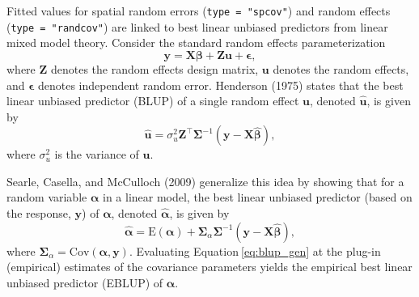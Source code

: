 \documentclass{article}
\begin{document}
Fitted values for spatial random errors (\texttt{type\ =\ "spcov"}) and
random effects (\texttt{type\ =\ "randcov"}) are linked to best linear
unbiased predictors from linear mixed model theory. Consider the
standard random effects parameterization \begin{equation*}
  \mathbf{y} = \mathbf{X} \boldsymbol{\beta} + \mathbf{Z} \mathbf{u} + \boldsymbol{\epsilon},
\end{equation*} where \(\mathbf{Z}\) denotes the random effects design
matrix, \(\mathbf{u}\) denotes the random effects, and
\(\boldsymbol{\epsilon}\) denotes independent random error. Henderson
(1975) states that the best linear unbiased predictor (BLUP) of a single
random effect \(\mathbf{u}\), denoted \(\mathbf{\hat{u}}\), is given by
\begin{equation}\label{eq:blup_mm}
  \mathbf{\hat{u}} = \sigma^2_u \mathbf{Z}^\top \mathbf{\Sigma}^{-1}(\mathbf{y} - \mathbf{X} \boldsymbol{\hat{\beta}}),
\end{equation} where \(\sigma^2_u\) is the variance of \(\mathbf{u}\).

Searle, Casella, and McCulloch (2009) generalize this idea by showing
that for a random variable \(\boldsymbol{\alpha}\) in a linear model,
the best linear unbiased predictor (based on the response,
\(\mathbf{y}\)) of \(\boldsymbol{\alpha}\), denoted
\(\boldsymbol{\hat{\alpha}}\), is given by
\begin{equation}\label{eq:blup_gen}
  \boldsymbol{\hat{\alpha}} = \text{E}(\boldsymbol{\alpha}) + \boldsymbol{\Sigma}_\alpha \boldsymbol{\Sigma}^{-1}(\mathbf{y} - \mathbf{X} \boldsymbol{\hat{\beta}}),
\end{equation} where
\(\boldsymbol{\Sigma}_\alpha = \text{Cov}(\boldsymbol{\alpha}, \mathbf{y})\).
Evaluating Equation\(~\)\ref{eq:blup_gen} at the plug-in (empirical)
estimates of the covariance parameters yields the empirical best linear
unbiased predictor (EBLUP) of \(\boldsymbol{\alpha}\).
\end{document}
